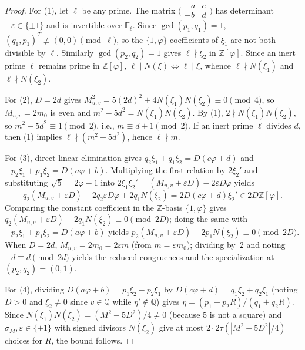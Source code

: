 \documentclass[11pt]{amsart}
\theoremstyle{definition}
\theoremstyle{remark}
\numberwithin{equation}{section}
\newcommand{\Q}{\mathbb{Q}}
\newcommand{\Z}{\mathbb{Z}}
\begin{document}
\begin{proof}
For (1), let $\ell$ be any prime. The matrix $\bigl(\begin{smallmatrix}-a&c\\-b&d\end{smallmatrix}\bigr)$
has determinant $-\varepsilon\in\{\pm1\}$ and is invertible over $\mathbb{F}_\ell$.
Since $\gcd(p_1,q_1)=1$, $(q_1,p_1)^T\not\equiv(0,0)\pmod\ell$, so the
$\{1,\varphi\}$-coefficients of $\xi_1$ are not both divisible by $\ell$.
Similarly $\gcd(p_2,q_2)=1$ gives $\ell\nmid\xi_2$ in $\Z[\varphi]$. Since
an inert prime $\ell$ remains prime in $\Z[\varphi]$,
$\ell\mid N(\xi)\iff\ell\mid\xi$, whence $\ell\nmid N(\xi_1)$ and
$\ell\nmid N(\xi_2)$.

For (2), $D=2d$ gives $M_{u,v}^2=5(2d)^2+4N(\xi_1)N(\xi_2)\equiv0\pmod4$,
so $M_{u,v}=2m_0$ is even and $m^2-5d^2=N(\xi_1)N(\xi_2)$. By (1), $2\nmid N(\xi_1)N(\xi_2)$,
so $m^2-5d^2\equiv1\pmod2$, i.e., $m\equiv d+1\pmod2$. If an inert prime
$\ell$ divides $d$, then (1) implies $\ell\nmid(m^2-5d^2)$, hence $\ell\nmid m$.

For (3), direct linear elimination gives
$q_2\xi_1+q_1\xi_2=D(c\varphi+d)$ and $-p_2\xi_1+p_1\xi_2=D(a\varphi+b)$.
Multiplying the first relation by $2\xi_2'$ and substituting $\sqrt5=2\varphi-1$
into $2\xi_1\xi_2'=(M_{u,v}+\varepsilon D)-2\varepsilon D\varphi$ yields
\[
 q_2(M_{u,v}+\varepsilon D)-2q_2\varepsilon D\varphi+2q_1N(\xi_2)
 =2D(c\varphi+d)\xi_2'\in 2D\Z[\varphi].
\]
Comparing the constant coefficient in the $\Z$-basis $\{1,\varphi\}$ gives
$q_2(M_{u,v}+\varepsilon D)+2q_1N(\xi_2)\equiv0\pmod{2D}$; doing the same
with $-p_2\xi_1+p_1\xi_2=D(a\varphi+b)$ yields
$p_2(M_{u,v}+\varepsilon D)-2p_1N(\xi_2)\equiv0\pmod{2D}$. When $D=2d$,
$M_{u,v}=2m_0=2\varepsilon m$ (from $m=\varepsilon m_0$); dividing by~$2$
and noting $-d\equiv d\pmod{2d}$ yields the reduced congruences and the
specialization at $(p_2,q_2)=(0,1)$.

For (4), dividing $D(a\varphi+b)=p_1\xi_2-p_2\xi_1$ by
$D(c\varphi+d)=q_1\xi_2+q_2\xi_1$ (noting $D>0$ and $\xi_2\ne0$ since
$v\in\Q$ while $\eta'\notin\Q$) gives $\eta=(p_1-p_2R)/(q_1+q_2R)$.
Since $N(\xi_1)N(\xi_2)=(M^2-5D^2)/4\ne0$ (because $5$ is not a square)
and $\sigma_M,\varepsilon\in\{\pm1\}$ with signed divisors $N(\xi_2)$ give
at most $2\cdot 2\tau(|M^2-5D^2|/4)$ choices for $R$, the bound follows.
\end{proof}
\end{document}
